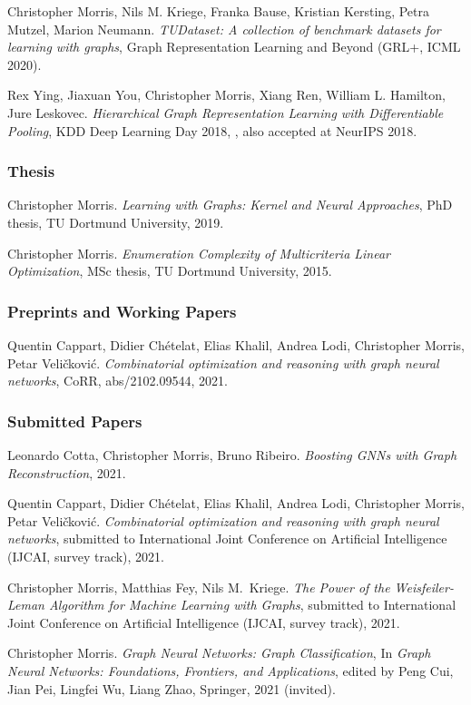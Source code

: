 \documentclass[11pt, a4paper, DIV=12]{scrartcl}
\begin{document}
\begin{thebibliography}{5}
Christopher Morris, Nils M. Kriege, Franka Bause, Kristian Kersting, Petra Mutzel, Marion Neumann.
\emph{TUDataset: A collection of benchmark datasets for learning with graphs},
Graph Representation Learning and Beyond (GRL+, ICML 2020).

Rex Ying, Jiaxuan You, Christopher Morris, Xiang Ren, William L. Hamilton, Jure Leskovec.
\emph{Hierarchical Graph Representation Learning with Differentiable Pooling},
KDD Deep Learning Day 2018, , also accepted at NeurIPS 2018.

\subsubsection*{Thesis}

Christopher Morris.
\emph{Learning with Graphs: Kernel and Neural Approaches}, PhD thesis, TU Dortmund University, 2019.

Christopher Morris.
\emph{Enumeration Complexity of Multicriteria Linear Optimization}, MSc thesis, TU Dortmund University, 2015.

\subsubsection*{Preprints and Working Papers}
Quentin Cappart, Didier Chételat, Elias Khalil, Andrea Lodi, Christopher Morris, Petar Veli\v{c}kovi\'{c}.
\emph{Combinatorial optimization and reasoning with graph neural networks},
CoRR, abs/2102.09544, 2021.
	
	
\subsubsection*{Submitted Papers}

Leonardo Cotta, Christopher Morris, Bruno Ribeiro.
\emph{Boosting GNNs with Graph Reconstruction}, 2021.	

Quentin Cappart, Didier Chételat, Elias Khalil, Andrea Lodi, Christopher Morris, Petar Veli\v{c}kovi\'{c}.
\emph{Combinatorial optimization and reasoning with graph neural networks},
submitted to International Joint Conference on Artificial Intelligence (IJCAI, survey track), 2021.	

Christopher Morris, Matthias Fey, Nils M.~Kriege.
\emph{The Power of the Weisfeiler-Leman Algorithm for Machine Learning with Graphs},
submitted to International Joint Conference on Artificial Intelligence (IJCAI, survey track), 2021.

Christopher Morris.
\emph{Graph Neural Networks: Graph Classification},
In \emph{Graph Neural Networks: Foundations, Frontiers, and Applications}, edited by Peng Cui, Jian Pei, Lingfei Wu, Liang Zhao, Springer, 2021 (invited).	
	
\end{thebibliography}
\end{document}
